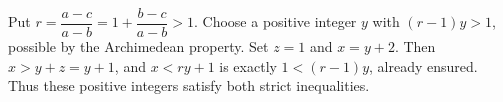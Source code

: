 Put $r=\dfrac{a-c}{a-b}=1+\dfrac{b-c}{a-b}>1$. Choose a positive integer $y$ with $(r-1)y>1$, possible by the Archimedean property. Set $z=1$ and $x=y+2$. Then $x>y+z=y+1$, and $x<ry+1$ is exactly $1<(r-1)y$, already ensured. Thus these positive integers satisfy both strict inequalities.
